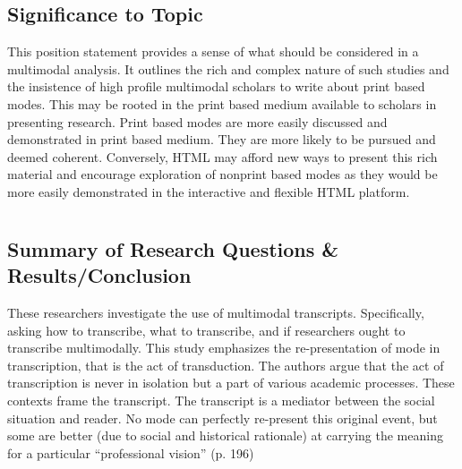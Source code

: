 \documentclass[leavefloats]{apa6e}\usepackage[]{graphicx}\usepackage[]{color}
\begin{document}
\subsection{Significance to Topic} %
This position statement provides a sense of what should be considered in a multimodal analysis.  It outlines the rich and complex nature of such studies and the insistence of high profile multimodal scholars to write about print based modes.  This may be rooted in the print based medium available to scholars in presenting research.  Print based modes are more easily discussed and demonstrated in print based medium.  They are more likely to be pursued and deemed coherent.  Conversely, HTML may afford new ways to present this rich material and encourage exploration of nonprint based modes as they would be more easily demonstrated in the interactive and flexible HTML platform.


 \section{\textcite{Bezemer2011}}





\regpar



\subsection{Summary of Research Questions \& Results/Conclusion} %
These researchers investigate the use of multimodal transcripts.  Specifically, asking how to transcribe, what to transcribe, and if researchers ought to transcribe multimodally.  This study emphasizes the re-presentation of mode in transcription, that is the act of transduction.  The authors argue that the act of transcription is never in isolation but a part of various academic processes.  These contexts frame the transcript.  The transcript is a mediator between the social situation and reader.  No mode can perfectly re-present this original event, but some are better (due to social and historical rationale) at carrying the meaning for a particular ``professional vision'' (p. 196)
\end{document}
